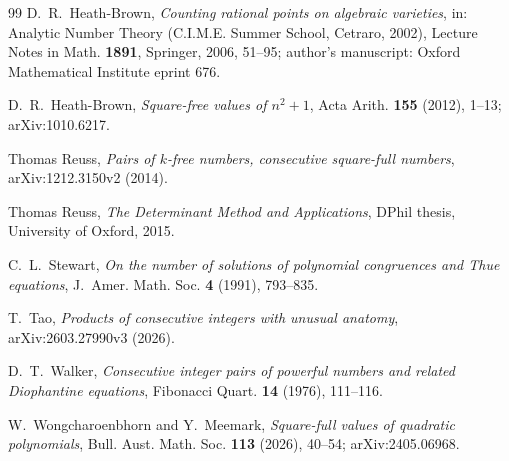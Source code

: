 \documentclass[11pt,reqno]{amsart}
\theoremstyle{definition}
\theoremstyle{remark}
\numberwithin{equation}{section}
\begin{document}
\begin{thebibliography}{99}
 D.~R.~Heath-Brown, \emph{Counting rational points on algebraic
varieties}, in: Analytic Number Theory (C.I.M.E. Summer School, Cetraro, 2002),
Lecture Notes in Math. \textbf{1891}, Springer, 2006, 51--95; author's
manuscript: Oxford Mathematical Institute eprint 676.

 D.~R.~Heath-Brown, \emph{Square-free values of $n^2+1$},
Acta Arith. \textbf{155} (2012), 1--13; arXiv:1010.6217.

 Thomas Reuss, \emph{Pairs of $k$-free numbers, consecutive
square-full numbers}, arXiv:1212.3150v2 (2014).

 Thomas Reuss, \emph{The Determinant Method and
Applications}, DPhil thesis, University of Oxford, 2015.

 C.~L.~Stewart, \emph{On the number of solutions of
polynomial congruences and Thue equations}, J.~Amer. Math. Soc. \textbf{4}
(1991), 793--835.

 T.~Tao, \emph{Products of consecutive integers with unusual
anatomy}, arXiv:2603.27990v3 (2026).

 D.~T.~Walker, \emph{Consecutive integer pairs of powerful
numbers and related Diophantine equations}, Fibonacci Quart. \textbf{14}
(1976), 111--116.

 W.~Wongcharoenbhorn and Y.~Meemark,
\emph{Square-full values of quadratic polynomials}, Bull. Aust. Math. Soc.
\textbf{113} (2026), 40--54; arXiv:2405.06968.

\end{thebibliography}
\end{document}
